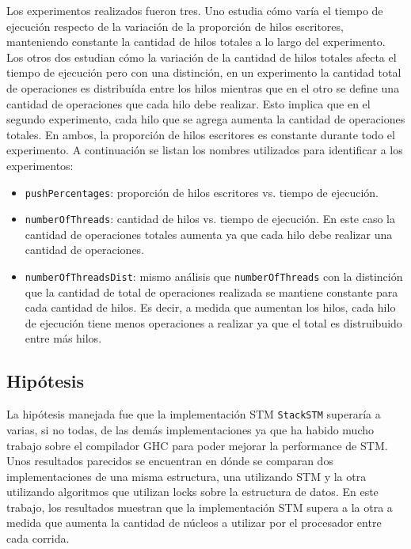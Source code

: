 Los experimentos realizados fueron tres.
Uno estudia cómo varía el tiempo de ejecución respecto de la variación de la proporción de hilos escritores, manteniendo constante la cantidad de hilos totales a lo largo del experimento.
Los otros dos estudian cómo la variación de la cantidad de hilos totales afecta el tiempo de ejecución pero con una distinción, en un experimento la cantidad total de operaciones es distribuída entre los hilos mientras que en el otro se define una cantidad de operaciones que cada hilo debe realizar. Esto implica que en el segundo experimento, cada hilo que se agrega aumenta la cantidad de operaciones totales. En ambos, la proporción de hilos escritores es constante durante todo el experimento.
A continuación se listan los nombres utilizados para identificar a los experimentos:

\begin{itemize}
    \item \texttt{pushPercentages}: proporción de hilos escritores vs. tiempo de ejecución.
    \item \texttt{numberOfThreads}: cantidad de hilos vs. tiempo de ejecución. En este caso la cantidad de operaciones totales aumenta ya que cada hilo debe realizar una cantidad de operaciones.
    \item \texttt{numberOfThreadsDist}: mismo análisis que \texttt{numberOfThreads} con la distinción que la cantidad de total de operaciones realizada se mantiene constante para cada cantidad de hilos. Es decir, a medida que aumentan los hilos, cada hilo de ejecución tiene menos operaciones a realizar ya que el total es distruibuido entre más hilos.
\end{itemize}

\subsection{Hipótesis}\label{subsec:hypothesis}
La hipótesis manejada fue que la implementación STM \texttt{StackSTM} superaría a varias, si no todas, de las demás implementaciones ya que ha habido mucho trabajo sobre el compilador GHC para poder mejorar la performance de STM.
Unos resultados parecidos se encuentran en \cite{abq} dónde se comparan dos implementaciones de una misma estructura, una utilizando STM y la otra utilizando algoritmos que utilizan locks sobre la estructura de datos.
En este trabajo, los resultados muestran que la implementación STM supera a la otra a medida que aumenta la cantidad de núcleos a utilizar por el procesador entre cada corrida.

